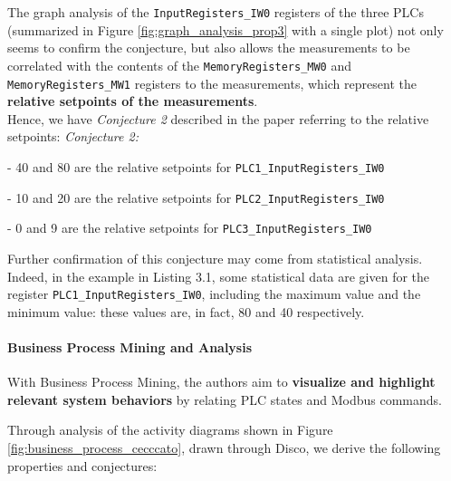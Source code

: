 The graph analysis of the \texttt{InputRegisters\_IW0} registers of the three PLCs (summarized in Figure \ref{fig:graph_analysis_prop3} with a single plot) not only seems to confirm the conjecture, but also allows the measurements to be correlated with the contents of the \texttt{MemoryRegisters\_MW0} and \texttt{MemoryRegisters\_MW1} registers to the measurements, which represent the \textbf{relative setpoints of the measurements}.\\
Hence, we have \textit{Conjecture 2} described in the paper referring to the relative setpoints:\newline \newline
\colorbox{backcolourtext}{\emph{Conjecture 2:}} 

	- 40 and 80 are the relative setpoints for \texttt{PLC1\_InputRegisters\_IW0}
	
	- 10 and 20 are the relative setpoints for \texttt{PLC2\_InputRegisters\_IW0}
	
	- 0 and 9 are the relative setpoints for \texttt{PLC3\_InputRegisters\_IW0} 

\bigskip
Further confirmation of this conjecture may come from statistical analysis. Indeed, in the example in Listing 3.1, some statistical data are given for the register \texttt{PLC1\_InputRegisters\_IW0}, including the maximum value and the minimum value: these values are, in fact, 80 and 40 respectively.

\paragraph{Business Process Mining and Analysis}
With Business Process Mining, the authors aim to \textbf{visualize and highlight relevant system behaviors} by relating PLC states and Modbus commands.

\bigskip
Through analysis of the activity diagrams shown in Figure \ref{fig:business_process_cecccato}, drawn through Disco, we derive the following properties and conjectures:

